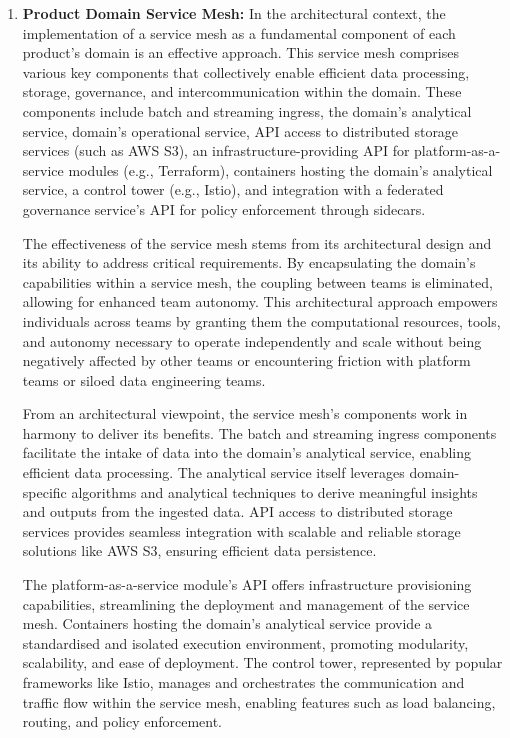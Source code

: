 \documentclass[preprint,12pt]{elsarticle}
\begin{document}
\begin{enumerate}
    \item \textbf{Product Domain Service Mesh:} In the architectural context, the implementation of a service mesh as a fundamental component of each product's domain is an effective approach. This service mesh comprises various key components that collectively enable efficient data processing, storage, governance, and intercommunication within the domain. These components include batch and streaming ingress, the domain's analytical service, domain's operational service, API access to distributed storage services (such as AWS S3), an infrastructure-providing API for platform-as-a-service modules (e.g., Terraform), containers hosting the domain's analytical service, a control tower (e.g., Istio), and integration with a federated governance service's API for policy enforcement through sidecars.

    The effectiveness of the service mesh stems from its architectural design and its ability to address critical requirements. By encapsulating the domain's capabilities within a service mesh, the coupling between teams is eliminated, allowing for enhanced team autonomy. This architectural approach empowers individuals across teams by granting them the computational resources, tools, and autonomy necessary to operate independently and scale without being negatively affected by other teams or encountering friction with platform teams or siloed data engineering teams.
    
    From an architectural viewpoint, the service mesh's components work in harmony to deliver its benefits. The batch and streaming ingress components facilitate the intake of data into the domain's analytical service, enabling efficient data processing. The analytical service itself leverages domain-specific algorithms and analytical techniques to derive meaningful insights and outputs from the ingested data. API access to distributed storage services provides seamless integration with scalable and reliable storage solutions like AWS S3, ensuring efficient data persistence.
    
    The platform-as-a-service module's API offers infrastructure provisioning capabilities, streamlining the deployment and management of the service mesh. Containers hosting the domain's analytical service provide a standardised and isolated execution environment, promoting modularity, scalability, and ease of deployment. The control tower, represented by popular frameworks like Istio, manages and orchestrates the communication and traffic flow within the service mesh, enabling features such as load balancing, routing, and policy enforcement.
    

\end{enumerate}
\end{document}
